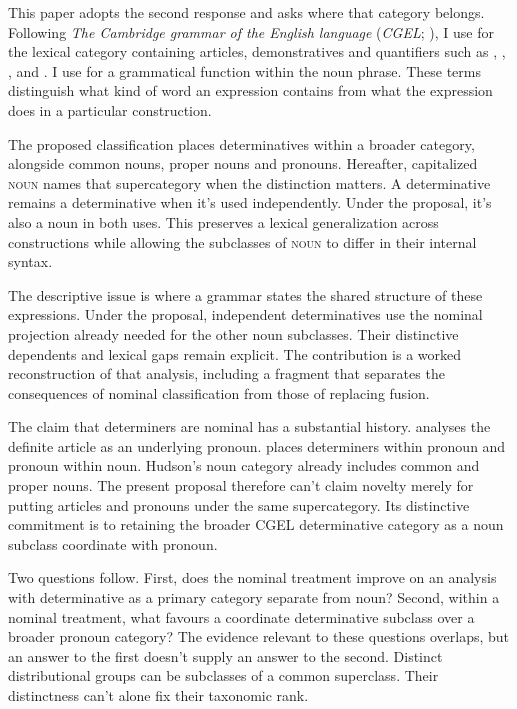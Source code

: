 \documentclass[12pt]{article}
\begin{document}
This paper adopts the second response and asks where that category belongs. Following \textit{The Cambridge grammar of the English language} (\textit{CGEL}; \citealt{huddleston2002}), I use  for the lexical category containing articles, demonstratives and quantifiers such as , , ,  and . I use  for a grammatical function within the noun phrase. These terms distinguish what kind of word an expression contains from what the expression does in a particular construction.

The proposed classification places determinatives within a broader  category, alongside common nouns, proper nouns and pronouns. Hereafter, capitalized \textsc{noun} names that supercategory when the distinction matters. A determinative remains a determinative when it's used independently. Under the proposal, it's also a noun in both uses. This preserves a lexical generalization across constructions while allowing the subclasses of \textsc{noun} to differ in their internal syntax.

The descriptive issue is where a grammar states the shared structure of these expressions. Under the proposal, independent determinatives use the nominal projection already needed for the other noun subclasses. Their distinctive dependents and lexical gaps remain explicit. The contribution is a worked reconstruction of that analysis, including a fragment that separates the consequences of nominal classification from those of replacing fusion.

The claim that determiners are nominal has a substantial history. \textcite{sommerstein1972} analyses the definite article as an underlying pronoun. \textcite{hudson2004determiners,hudson2010wordgrammar} places determiners within pronoun and pronoun within noun. Hudson's noun category already includes common and proper nouns. The present proposal therefore can't claim novelty merely for putting articles and pronouns under the same supercategory. Its distinctive commitment is to retaining the broader CGEL determinative category as a noun subclass coordinate with pronoun.

Two questions follow. First, does the nominal treatment improve on an analysis with determinative as a primary category separate from noun? Second, within a nominal treatment, what favours a coordinate determinative subclass over a broader pronoun category? The evidence relevant to these questions overlaps, but an answer to the first doesn't supply an answer to the second. Distinct distributional groups can be subclasses of a common superclass. Their distinctness can't alone fix their taxonomic rank.
\end{document}
